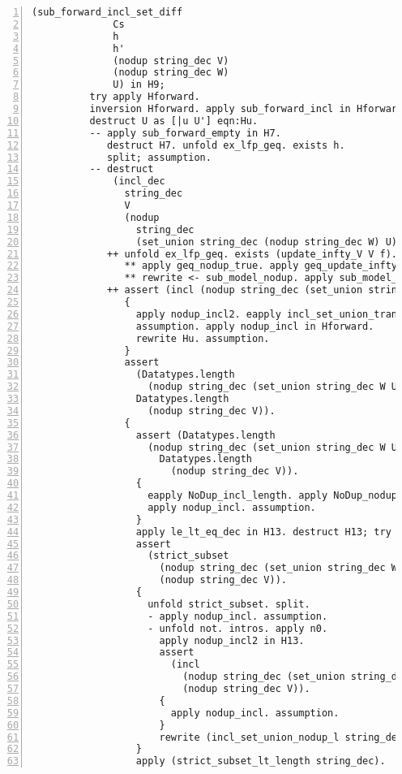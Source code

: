 \begin{lstlisting}[language=Coq, label={lst:thm_32_full_proof}, caption={Full proof of Theorem 3.2 in Coq}, numbers=left]
            (sub_forward_incl_set_diff
              Cs
              h
              h'
              (nodup string_dec V)
              (nodup string_dec W)
              U) in H9;
          try apply Hforward.
          inversion Hforward. apply sub_forward_incl in Hforward.
          destruct U as [|u U'] eqn:Hu.
          -- apply sub_forward_empty in H7.
             destruct H7. unfold ex_lfp_geq. exists h.
             split; assumption.
          -- destruct
              (incl_dec
                string_dec
                V
                (nodup
                  string_dec
                  (set_union string_dec (nodup string_dec W) U))).
             ++ unfold ex_lfp_geq. exists (update_infty_V V f). split.
                ** apply geq_nodup_true. apply geq_update_infty_V.
                ** rewrite <- sub_model_nodup. apply sub_model_update_infty_V.
             ++ assert (incl (nodup string_dec (set_union string_dec W U)) V).
                {
                  apply nodup_incl2. eapply incl_set_union_trans.
                  assumption. apply nodup_incl in Hforward.
                  rewrite Hu. assumption.
                }
                assert
                  (Datatypes.length
                    (nodup string_dec (set_union string_dec W U)) <
                  Datatypes.length
                    (nodup string_dec V)).
                {
                  assert (Datatypes.length
                    (nodup string_dec (set_union string_dec W U)) <=
                      Datatypes.length
                        (nodup string_dec V)).
                  {
                    eapply NoDup_incl_length. apply NoDup_nodup.
                    apply nodup_incl. assumption.
                  }
                  apply le_lt_eq_dec in H13. destruct H13; try assumption.
                  assert
                    (strict_subset
                      (nodup string_dec (set_union string_dec W U))
                      (nodup string_dec V)).
                  {
                    unfold strict_subset. split.
                    - apply nodup_incl. assumption.
                    - unfold not. intros. apply n0.
                      apply nodup_incl2 in H13.
                      assert
                        (incl
                          (nodup string_dec (set_union string_dec W U))
                          (nodup string_dec V)).
                      {
                        apply nodup_incl. assumption.
                      }
                      rewrite (incl_set_union_nodup_l string_dec). assumption.
                  }
                  apply (strict_subset_lt_length string_dec).

\end{lstlisting}
